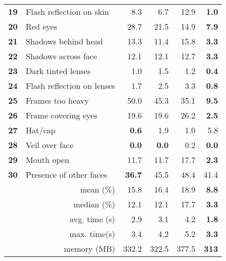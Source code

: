 \begin{table}[htbp]
{\begin{tabular}{clrrrr}
\textbf{19} & Flash reflection on skin          & 8.3           & 6.7          & 12.9  & \textbf{1.0}  \\
\textbf{20} & Red eyes                          & 28.7          & 21.5         & 14.9  & \textbf{7.9}  \\
\textbf{21} & Shadows behind head               & 13.3          & 11.4         & 15.8  & \textbf{3.3}  \\
\textbf{22} & Shadows across face               & 12.1          & 12.1         & 12.7  & \textbf{3.3}  \\
\textbf{23} & Dark tinted lenses                & 1.0           & 1.5          & 1.2   & \textbf{0.4}  \\
\textbf{24} & Flash reflection on lenses        & 1.7           & 2.5          & 3.3   & \textbf{0.8}  \\
\textbf{25} & Frames too heavy                  & 50.0          & 45.3         & 35.1  & \textbf{9.5}  \\
\textbf{26} & Frame covering eyes               & 19.6          & 19.6         & 26.2  & \textbf{2.5}  \\
\textbf{27} & Hat/cap                           & \textbf{0.6}  & 1.9          & 1.0   & 5.8           \\
\textbf{28} & Veil over face                    & \textbf{0.0}  & \textbf{0.0} & 0.2   & \textbf{0.0}  \\
\textbf{29} & Mouth open                        & 11.7          & 11.7         & 17.7  & \textbf{2.3}  \\
\textbf{30} & Presence of other faces           & \textbf{36.7} & 45.5         & 48.4  & 41.4          \\ \hline
            & \multicolumn{1}{r}{mean (\%)}      & 15.8          & 16.4         & 18.9  & \textbf{8.8}  \\
            & \multicolumn{1}{r}{median (\%)}    & 12.1          & 12.1         & 17.7  & \textbf{3.3}  \\
            & \multicolumn{1}{r}{avg. time (s)} & 2.9           & 3.1          & 4.2   & \textbf{1.8}  \\
            & \multicolumn{1}{r}{max. time(s)}  & 3.4           & 4.2          & 5.2   & \textbf{3.3}  \\
            & \multicolumn{1}{r}{memory (MB)}   & 332.2         & 322.5        & 377.5 & \textbf{313} 
\end{tabular}%
}
\end{table}